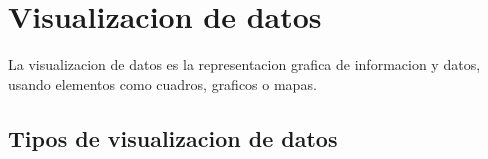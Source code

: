 \section{Visualizacion de datos}

La visualizacion de datos es la representacion grafica de informacion y datos, usando elementos como cuadros, graficos o mapas.

\subsection{Tipos de visualizacion de datos}